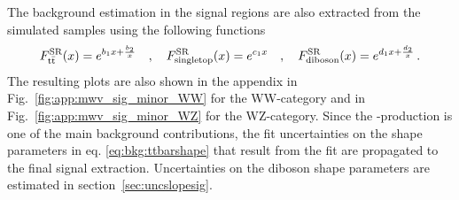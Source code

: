 \noindent The background estimation in the signal regions are also extracted from the simulated samples using the following functions
\begin{equation}
F_{\mathrm{t}\bar{\mathrm{t}}}^{\rm SR}(x) = e^{b_1x+\frac{b_2}{x}} \quad , \quad \label{eq:bkg:ttbarshape}
F_{\rm singletop}^{\rm SR}(x) = e^{c_1x} \quad , \quad 
F_{\rm diboson}^{\rm SR}(x) = e^{d_1x+\frac{d_2}{x}} \, .
\end{equation}
The resulting plots are also shown in the appendix in Fig.~\ref{fig:app:mwv_sig_minor_WW} for the WW-category and in Fig.~\ref{fig:app:mwv_sig_minor_WZ} for the WZ-category. Since the \ttbar -production is one of the main background contributions, the fit uncertainties on the shape parameters in eq. \ref{eq:bkg:ttbarshape} that result from the fit are propagated to the final signal extraction. Uncertainties on the diboson shape parameters are estimated in section~\ref{sec:uncslopesig}.

